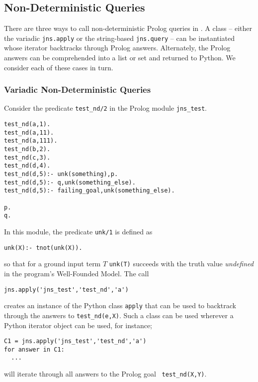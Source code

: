 
\subsection{Non-Deterministic Queries}\label{sec:jnsnteddet}

There are three ways to call non-deterministic Prolog queries in
\januspy .  A class -- either the variadic {\tt jns.apply} or the
string-based {\tt jns.query} -- can be instantiated whose iterator
backtracks through Prolog answers.  Alternately, the Prolog answers
can be comprehended into a list or set and returned to Python.  We
consider each of these cases in turn.

\subsubsection{Variadic Non-Deterministic Queries} \label{sec:var-nd}

Consider the predicate {\tt test\_nd/2} in the Prolog module {\tt jns\_test}.
{\small  
\begin{verbatim}  
test_nd(a,1).
test_nd(a,11).
test_nd(a,111).
test_nd(b,2).
test_nd(c,3).
test_nd(d,4).
test_nd(d,5):- unk(something),p.
test_nd(d,5):- q,unk(something_else).
test_nd(d,5):- failing_goal,unk(something_else).

p.
q.
\end{verbatim} }
\noindent
In this module, the predicate {\tt unk/1} is defined as
\begin{verbatim}
unk(X):- tnot(unk(X)).
\end{verbatim}
\noindent
so that for a ground input term $T$ {\tt unk(T)} succeeds with the
truth value {\em undefined} in the program's Well-Founded Model.
%
The call
\begin{verbatim}
jns.apply('jns_test','test_nd','a')
\end{verbatim}
creates an instance of the Python class {\tt apply} that can be used
to backtrack through the answers to {\tt test\_nd(e,X)}.
Such a class can be used wherever a Python iterator object
can be used, for instance;
\begin{verbatim}
C1 = jns.apply('jns_test','test_nd','a')
for answer in C1:
  ...
\end{verbatim}
will iterate through all answers to the Prolog goal {\tt
  test\_nd(X,Y)}.

